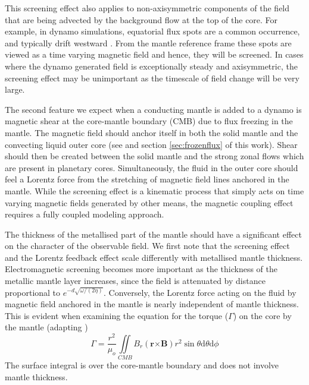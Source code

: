 This screening effect also applies to non-axisymmetric components of the field that are being advected by the background flow at the top of the core. For example, in dynamo simulations, equatorial flux spots are a common occurrence, and typically drift westward \citep{finlay2003}.  From the mantle reference frame these spots are viewed as a time varying magnetic field and hence, they will be screened. In cases where the dynamo generated field is exceptionally steady and axisymmetric, the screening effect may be unimportant as the timescale of field change will be very large.

The second feature we expect when a conducting mantle is added to a dynamo is magnetic shear at the core-mantle boundary (CMB) due to flux freezing in the mantle. The magnetic field should anchor itself in both the solid mantle and the convecting liquid outer core (see \citet{moffatt1978} and section \ref{sec:frozenflux} of this work). Shear should then be created between the solid mantle and the strong zonal flows which are present in planetary cores. Simultaneously, the fluid in the outer core should feel a Lorentz force from the stretching of magnetic field lines anchored in the mantle. While the screening effect is a kinematic process that simply acts on time varying magnetic fields generated by other means, the magnetic coupling effect requires a fully coupled modeling approach.

The thickness of the metallised part of the mantle should have a significant effect on the character of the observable field. We first note that the screening effect and the Lorentz feedback effect scale differently with metallised mantle thickness. Electromagnetic screening becomes more important as the thickness of the metallic mantle layer increases, since the field is attenuated by distance proportional to $e^{-d\sqrt{\omega/(2 \eta)}}$. Conversely, the Lorentz force acting on the fluid by magnetic field anchored in the mantle is nearly independent of mantle thickness. This is evident when examining the equation for the torque ($\Gamma$) on the core by the mantle (adapting \citep{gubbins1987})
\begin{equation}
\Gamma=\frac{r^{2}}{\mu_{o}}\iint\limits_{CMB}B_r\left(\mathbf{r}\mathbf{\mathbf{\times}}\mathbf{B}\right)r^{2} \sin\theta \mathrm{d}\theta \mathrm{d}\phi
\end{equation}
The surface integral is over the core-mantle boundary and does not involve mantle thickness. 

